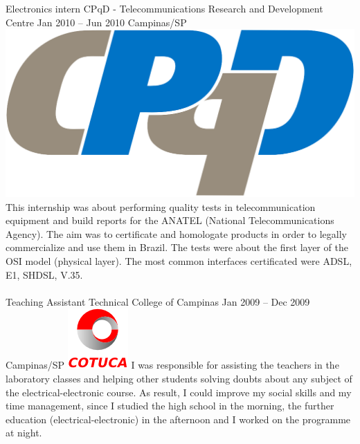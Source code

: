 \documentclass[
	a4paper,
]{fortysecondscv}
\newcommand{\profiledivider}{\textcolor{body!30}{\hdashrule{\linewidth}{0.6pt}{0.5ex}}\\}
\begin{document}
    \\\profiledivider
    \vspace{-2.2mm}
    \cvevent
        {Electronics intern}
        {CPqD - Telecommunications Research and Development Centre}
        {Jan 2010 -- Jun 2010}
        {Campinas/SP}
        {\hspace{2mm}\includegraphics[height=0.05\textwidth]{CPqD}}
        {This internship was about performing quality tests in telecommunication equipment and build reports for the ANATEL (National Telecommunications Agency). The aim was to certificate and homologate products in order to legally commercialize and use them in Brazil. The tests were about the first layer of the OSI model (physical layer). The most common interfaces certificated were ADSL, E1, SHDSL, V.35.}
    \\\profiledivider
    \vspace{-2.2mm}
    \cvevent
        {Teaching Assistant}
        {Technical College of Campinas}
        {Jan 2009 -- Dec 2009}
        {Campinas/SP}
        {\hspace{2mm}\includegraphics[height=0.07\textwidth]{Cotuca}}
        {I was responsible for assisting the teachers in the laboratory classes and helping other students solving doubts about any subject of the electrical-electronic course. As result, I could improve my social skills and my time management, since I studied the high school in the morning, the further education (electrical-electronic) in the afternoon and I worked on the programme at night.}
\vspace{-1mm}

\vspace{3mm}
\graphicspath{{../figures/}}
\newcommand{\pdf}[1]{\href{#1}{\texttt{[image: pdf]}\hspace{1mm}}}
\end{document}

